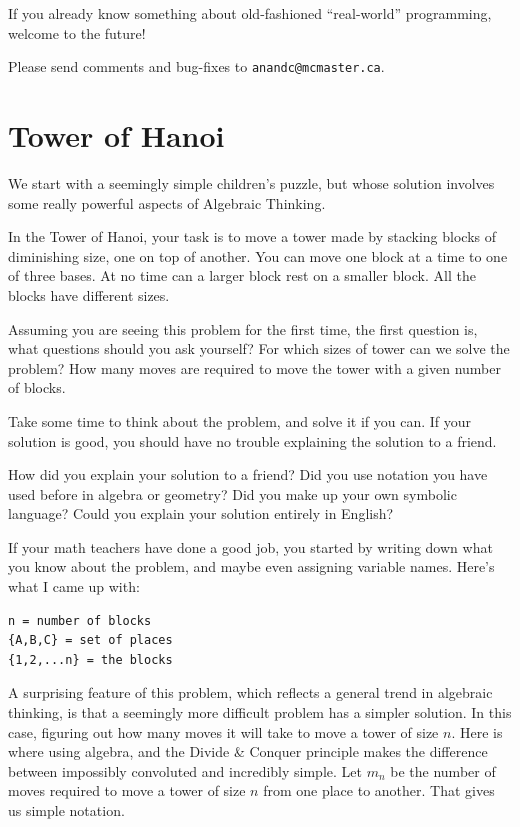 \documentclass[12pt]{amsbook}
\begin{document}
If you already know something about old-fashioned ``real-world'' programming, 
welcome to the future! 

Please send comments and bug-fixes to \verb|anandc@mcmaster.ca|.

\chapter{Tower of Hanoi}

We start with a seemingly simple children's puzzle, but whose solution involves some really powerful aspects of Algebraic Thinking.

In the Tower of Hanoi, your task is to move a tower made by stacking blocks of diminishing size, one on top of another.  You can move one block at a time to one of three bases.  At no time can a larger block rest on a smaller block.  All the blocks have different sizes.

Assuming you are seeing this problem for the first time, the first question is, what questions should you ask yourself?  For which sizes of tower can we solve the problem?  How many moves are required to move the tower with a given number of blocks.

Take some time to think about the problem, and solve it if you can.  If your solution is good, you should have no trouble explaining the solution to a friend.

How did you explain your solution to a friend?  Did you use notation you have used before in algebra or geometry?  Did you make up your own symbolic language?  Could you explain your solution entirely in English?

If your math teachers have done a good job, you started by writing down what you know about the problem, and maybe even assigning variable names.  Here's what I came up with:

\begin{verbatim}
n = number of blocks
{A,B,C} = set of places
{1,2,...n} = the blocks
\end{verbatim}

A surprising feature of this problem, which reflects a general trend in algebraic thinking, is that a seemingly more difficult problem has a simpler solution.  In this case, figuring out how many moves it will take to move a tower of size $n$.  Here is where using algebra, and the Divide \& Conquer principle makes the difference between impossibly convoluted and incredibly simple.  Let $m_n$ be the number of moves required to move a tower of size $n$ from one place to another.  That gives us simple notation.
\end{document}

